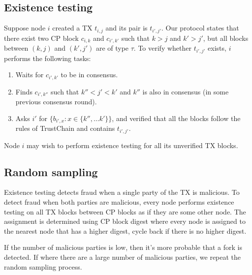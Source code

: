 \subsection{Existence testing}
Suppose node $i$ created a TX $t_{i,j}$ and its pair is $t_{i',j'}$. Our
protocol states that there exist two CP block $c_{i,k}$ and $c_{i',k'}$ such
that $k>j$ and $k' > j'$, but all blocks between $(k, j)$ and $(k', j')$ are of
type $\tau$. To verify whether $t_{i', j'}$ exists, $i$ performs the following
tasks:
\begin{enumerate}
\item Waits for $c_{i', k'}$ to be in consensus.
\item Finds $c_{i', k''}$ such that $k'' < j' < k'$ and $k''$ is also in
  consensus (in some previous consensus round).
\item Asks $i'$ for $\{b_{i', x} : x \in \{ k'', \dots k' \}\}$, and verified
  that all the blocks follow the rules of TrustChain and contains $t_{i', j'}$.
\end{enumerate}

Node $i$ may wish to perform existence testing for all its unverified TX blocks.

\subsection{Random sampling}
Existence testing detects fraud when a single party of the TX is malicious. To
detect fraud when both parties are malicious, every node performs existence
testing on all TX blocks between CP blocks as if they are some other node. The
assignment is determined using CP block digest where every node is assigned to
the nearest node that has a higher digest, cycle back if there is no higher
digest.

If the number of malicious parties is low, then it's more probable that a fork
is detected. If where there are a large number of malicious parties, we repeat
the random sampling process.

